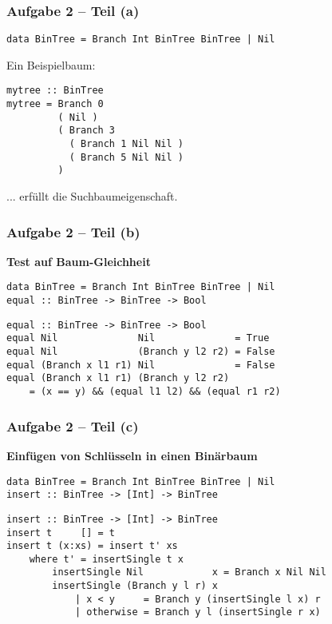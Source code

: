\documentclass{beamer}
\begin{document}
\begin{frame}[t, fragile] \frametitle{Aufgabe 2 -- Teil (a)}
	\begin{lstlisting}[style=bg]
data BinTree = Branch Int BinTree BinTree | Nil
	\end{lstlisting}
	\pause
	
	Ein Beispielbaum: \\[6pt]
	\begin{lstlisting}[style=bg]
mytree :: BinTree 
mytree = Branch 0 
         ( Nil )
         ( Branch 3 
           ( Branch 1 Nil Nil )
           ( Branch 5 Nil Nil )
         )
	\end{lstlisting}
	... erfüllt die Suchbaumeigenschaft.
\end{frame}

\begin{frame}[t, fragile] \frametitle{Aufgabe 2 -- Teil (b)}
	\textbf{Test auf Baum-Gleichheit}
	
	\pause
	
	\begin{lstlisting}[style=bg]
data BinTree = Branch Int BinTree BinTree | Nil
equal :: BinTree -> BinTree -> Bool
	\end{lstlisting}
	
	\bigskip \pause
	
	\begin{lstlisting}[style=bg]
equal :: BinTree -> BinTree -> Bool
equal Nil              Nil              = True
equal Nil              (Branch y l2 r2) = False
equal (Branch x l1 r1) Nil              = False
equal (Branch x l1 r1) (Branch y l2 r2)
	= (x == y) && (equal l1 l2) && (equal r1 r2)
	\end{lstlisting}
\end{frame}

\begin{frame}[t, fragile] \frametitle{Aufgabe 2 -- Teil (c)}
	\textbf{Einfügen von Schlüsseln in einen Binärbaum}
	
	\begin{lstlisting}[style=bg]
data BinTree = Branch Int BinTree BinTree | Nil 
insert :: BinTree -> [Int] -> BinTree
	\end{lstlisting}
	
	\bigskip \pause
	
	\begin{lstlisting}[style=bg]
insert :: BinTree -> [Int] -> BinTree
insert t     [] = t
insert t (x:xs) = insert t' xs
    where t' = insertSingle t x
        insertSingle Nil            x = Branch x Nil Nil
        insertSingle (Branch y l r) x
            | x < y     = Branch y (insertSingle l x) r
            | otherwise = Branch y l (insertSingle r x)
	\end{lstlisting}
\end{frame}
\end{document}
